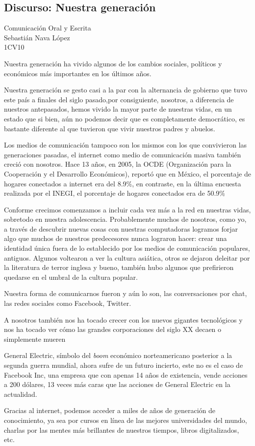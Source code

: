 \documentclass[a4paper,12pt]{article}
\newcommand{\titlehomework}[4]{\begin{center}\section*{#4}{\large #2}\\#1\\#3\\[2ex]\end{center}}
\begin{document}
\titlehomework{Sebastián Nava López}{Comunicación Oral y
Escrita}{1CV10}{Discurso: Nuestra generación}
Nuestra generación ha vivido algunos de los cambios sociales, políticos y económicos más
importantes en los últimos años.

Nuestra generación se gesto casi a la par con la alternancia de gobierno que tuvo este país a
finales del siglo pasado,por consiguiente, nosotros, a diferencia de nuestros antepasados, hemos vivido la mayor parte de nuestras vidas, en un estado que si bien, aún no podemos decir que es completamente democrático, es bastante diferente al que tuvieron que vivir nuestros padres y abuelos.

Los medios de comunicación tampoco son los mismos con los que convivieron las generaciones pasadas, el internet como medio de comunicación masiva también creció con nosotros. Hace 13 años, en 2005, la OCDE (Organización para la Cooperación y el Desarrollo Económicos), reportó que en
México, el porcentaje de hogares conectados a internet era del 8.9\%, en contraste, en la última
encuesta realizada por el INEGI, el porcentaje de hogares conectados era de 50.9\%

Conforme crecimos comenzamos a incluir cada vez más a la red en nuestras vidas, sobretodo en nuestra adolescencia. Probablemente muchos de nosotros, como yo, a través de descubrir nuevas cosas con nuestras computadoras logramos forjar algo que muchos de nuestros predecesores nunca lograron hacer: crear una identidad única fuera de lo establecido por los medios de comunicación populares, antiguos. Algunos voltearon a ver la cultura asiática, otros se dejaron deleitar por la literatura de terror inglesa y bueno, también hubo algunos que prefirieron quedarse en el umbral de la cultura popular.

Nuestra forma de comunicarnos fueron y aún lo son, las conversaciones por chat, las redes sociales como Facebook, Twitter.

A nosotros también nos ha tocado crecer con los nuevos gigantes tecnológicos y nos ha tocado ver cómo las grandes corporaciones del siglo XX decaen o simplemente mueren

General Electric, símbolo del \textit{boom} económico norteamericano posterior a la segunda guerra mundial, ahora sufre de un futuro incierto, este no es el caso de Facebook Inc, una empresa que con apenas 14 años de existencia, vende acciones a 200 dólares, 13 veces más caras que las acciones de General Electric en la actualidad.

Gracias al internet, podemos acceder a miles de años de generación de conocimiento, ya sea por cursos en línea de las mejores universidades del mundo, charlas por las mentes más brillantes de nuestros tiempos, libros digitalizados, etc.
\end{document}
